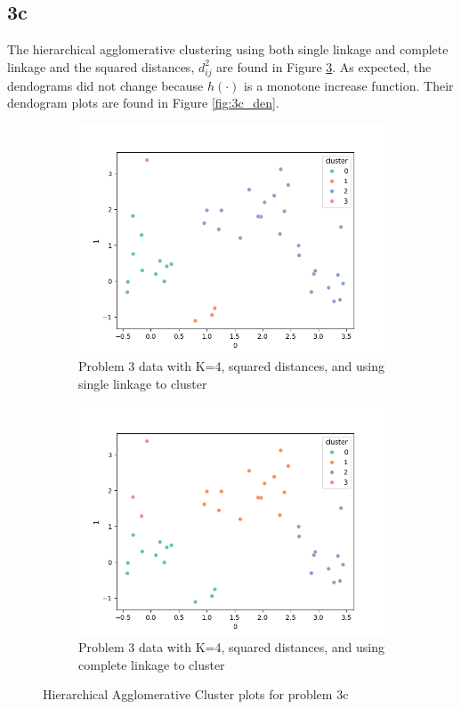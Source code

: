 \documentclass[12pt]{article}
\begin{document}
\subsection*{3c}
The hierarchical agglomerative clustering using both single linkage and complete linkage and the squared distances, $d_{ij}^2$ are found in Figure \ref{fig:3c}. As expected, the dendograms did not change because $h(\cdot)$ is a monotone increase function. Their dendogram plots are found in Figure \ref{fig:3c_den}.

\begin{figure}
    \begin{subfigure}{0.5\textwidth}
        \centering
        \includegraphics[width=\linewidth]{../plots/single_squared.png}
        \caption{Problem 3 data with K=4, squared distances, and using single linkage to cluster}
        \label{fig:single_squared}
    \end{subfigure}
    \begin{subfigure}{0.5\textwidth}
        \centering
        \includegraphics[width=\linewidth]{../plots/complete_squared.png}
        \caption{Problem 3 data with K=4, squared distances, and using complete linkage to cluster}
        \label{fig:complete_squared}
    \end{subfigure}
    \caption{Hierarchical Agglomerative Cluster plots for problem 3c}\label{fig:3c}
\end{figure}
\end{document}
